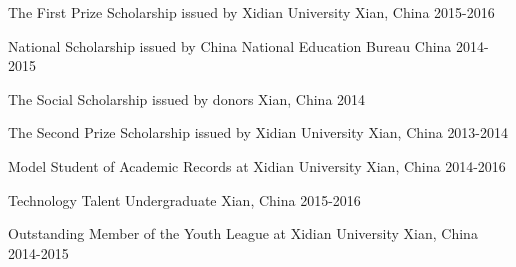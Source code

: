 
\begin{cvhonors}

  \cvhonor
    {The First Prize Scholarship} %
    {issued by Xidian University} %
    {Xian, China } %
    {2015-2016} %

  \cvhonor
    {National Scholarship} %
    {issued by China National Education Bureau} %
    {China } %
    {2014-2015} %

  \cvhonor
    {The Social Scholarship} %
    {issued by donors} %
   {Xian, China } %
    {2014} %

  \cvhonor
    {The Second Prize Scholarship} %
	{issued by Xidian University}
    {Xian, China } %
    {2013-2014} %
    
\end{cvhonors}


\begin{cvhonors}
	
	 \cvhonor
	{Model Student of Academic Records at Xidian University } %
	{} %
	{Xian, China} %
	{2014-2016} %

	\cvhonor
	{Technology Talent Undergraduate} %
	{} %
	{Xian, China} %
	{2015-2016} %
	
	\cvhonor
	{Outstanding Member of the Youth League at Xidian University} %
	{} %
	{Xian, China} %
	{2014-2015} %
	
\end{cvhonors}




